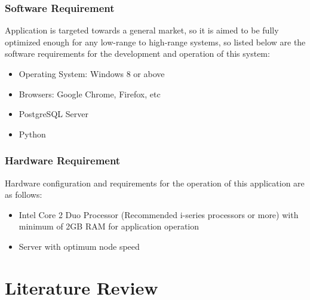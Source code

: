 \subsection{Software Requirement}
Application is targeted towards a general market, 
so it is aimed to be fully optimized enough for any low-range to 
high-range systems, so listed below are 
the software requirements for the development and operation of this system:
\vspace{-18pt}
\begin{itemize}
   \item Operating System: Windows 8 or above 
   \item Browsers: Google Chrome, Firefox, etc
   \item PostgreSQL Server
   \item Python
\end{itemize}

\subsection{Hardware Requirement}
Hardware configuration and requirements for the 
operation of this application are as follows: 
\vspace{-18pt}
\begin{itemize}
   \item Intel Core 2 Duo Processor (Recommended i-series processors or more) with minimum of 2GB RAM for application operation 
   \item Server with optimum node speed
\end{itemize}



\chapter{Literature Review}

